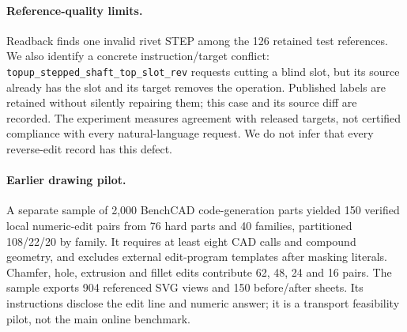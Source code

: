 \paragraph{Reference-quality limits.}
Readback finds one invalid rivet STEP among the 126 retained test references. We also identify a concrete instruction/target conflict: \texttt{topup\_stepped\_shaft\_top\_slot\_rev} requests cutting a blind slot, but its source already has the slot and its target removes the operation. Published labels are retained without silently repairing them; this case and its source diff are recorded. The experiment measures agreement with released targets, not certified compliance with every natural-language request. We do not infer that every reverse-edit record has this defect.

\paragraph{Earlier drawing pilot.}
A separate sample of 2,000 BenchCAD code-generation parts yielded 150 verified local numeric-edit pairs from 76 hard parts and 40 families, partitioned 108/22/20 by family. It requires at least eight CAD calls and compound geometry, and excludes external edit-program templates after masking literals. Chamfer, hole, extrusion and fillet edits contribute 62, 48, 24 and 16 pairs. The sample exports 904 referenced SVG views and 150 before/after sheets. Its instructions disclose the edit line and numeric answer; it is a transport feasibility pilot, not the main online benchmark.
